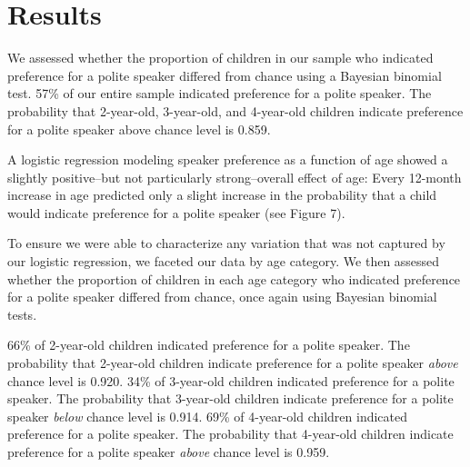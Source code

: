 \documentclass[
  english,
  man,floatsintext]{apa6}
\begin{document}
\hypertarget{results}{%
\section{Results}\label{results}}

We assessed whether the proportion of children in our sample who indicated preference for a polite speaker differed from chance using a Bayesian binomial test. 57\% of our entire sample indicated preference for a polite speaker. The probability that 2-year-old, 3-year-old, and 4-year-old children indicate preference for a polite speaker above chance level is 0.859.

A logistic regression modeling speaker preference as a function of age showed a slightly positive--but not particularly strong--overall effect of age: Every 12-month increase in age predicted only a slight increase in the probability that a child would indicate preference for a polite speaker (see Figure 7).

To ensure we were able to characterize any variation that was not captured by our logistic regression, we faceted our data by age category. We then assessed whether the proportion of children in each age category who indicated preference for a polite speaker differed from chance, once again using Bayesian binomial tests.

66\% of 2-year-old children indicated preference for a polite speaker. The probability that 2-year-old children indicate preference for a polite speaker \emph{above} chance level is 0.920. 34\% of 3-year-old children indicated preference for a polite speaker. The probability that 3-year-old children indicate preference for a polite speaker \emph{below} chance level is 0.914. 69\% of 4-year-old children indicated preference for a polite speaker. The probability that 4-year-old children indicate preference for a polite speaker \emph{above} chance level is 0.959.

\newpage
\end{document}
